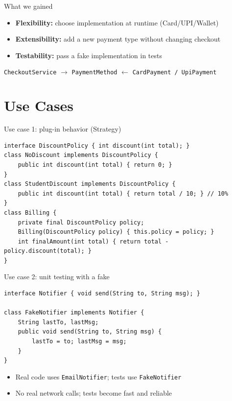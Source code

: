 \documentclass{beamer}
\begin{document}
\begin{frame}{What we gained}
  \begin{itemize}[<+->]
    \item \textbf{Flexibility:} choose implementation at runtime (Card/UPI/Wallet)
    \item \textbf{Extensibility:} add a new payment type without changing checkout
    \item \textbf{Testability:} pass a fake implementation in tests
  \end{itemize}

  \vspace{0.5em}
  \begin{center}
    \texttt{CheckoutService} $\rightarrow$ \texttt{PaymentMethod} $\leftarrow$ \texttt{CardPayment / UpiPayment}
  \end{center}
\end{frame}

\section{Use Cases}
\label{sec:usecases}

\begin{frame}[fragile]{Use case 1: plug-in behavior (Strategy)}
\begin{lstlisting}
interface DiscountPolicy { int discount(int total); }
class NoDiscount implements DiscountPolicy {
    public int discount(int total) { return 0; }
}
class StudentDiscount implements DiscountPolicy {
    public int discount(int total) { return total / 10; } // 10%
}
class Billing {
    private final DiscountPolicy policy;
    Billing(DiscountPolicy policy) { this.policy = policy; }
    int finalAmount(int total) { return total - policy.discount(total); }
}
\end{lstlisting}
\end{frame}

\begin{frame}[fragile]{Use case 2: unit testing with a fake}
\begin{lstlisting}
interface Notifier { void send(String to, String msg); }

class FakeNotifier implements Notifier {
    String lastTo, lastMsg;
    public void send(String to, String msg) {
        lastTo = to; lastMsg = msg;
    }
}
\end{lstlisting}
\begin{itemize}[<+->]
  \item Real code uses \texttt{EmailNotifier}; tests use \texttt{FakeNotifier}
  \item No real network calls; tests become fast and reliable
\end{itemize}
\end{frame}
\end{document}
